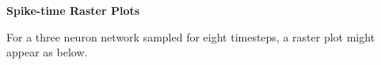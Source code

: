 \documentclass[12pt]{article}
\begin{document}
\begin{posterbard}
	\begin{posterbox}
		\begin{center}\textbf{Spike-time Raster Plots}\end{center}
		For a three neuron network sampled for eight timesteps, a raster plot 
		might appear as below.\\
		\vspace{1em}
		\begin{center}
\end{center}
\end{posterbox}
\end{posterbard}
\end{document}
